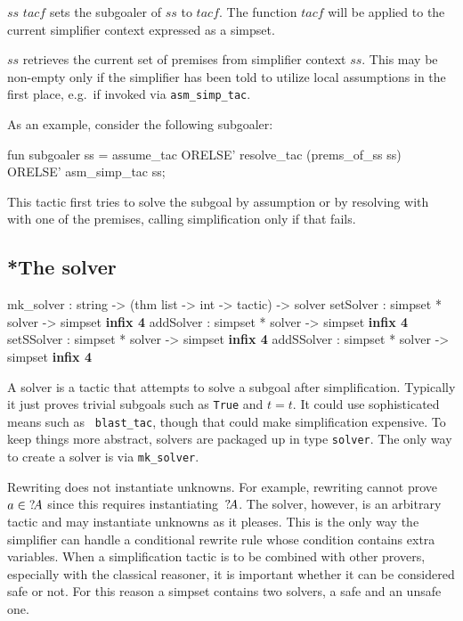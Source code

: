 \begin{ttdescription}
  
\item[$ss$ \ttindexbold{setsubgoaler} $tacf$] sets the subgoaler of
  $ss$ to $tacf$.  The function $tacf$ will be applied to the current
  simplifier context expressed as a simpset.
  
\item[\ttindexbold{prems_of_ss} $ss$] retrieves the current set of
  premises from simplifier context $ss$.  This may be non-empty only
  if the simplifier has been told to utilize local assumptions in the
  first place, e.g.\ if invoked via \texttt{asm_simp_tac}.

\end{ttdescription}

As an example, consider the following subgoaler:
\begin{ttbox}
fun subgoaler ss =
    assume_tac ORELSE'
    resolve_tac (prems_of_ss ss) ORELSE'
    asm_simp_tac ss;
\end{ttbox}
This tactic first tries to solve the subgoal by assumption or by
resolving with with one of the premises, calling simplification only
if that fails.


\subsection{*The solver}\label{sec:simp-solver}
\begin{ttbox}
mk_solver  : string -> (thm list -> int -> tactic) -> solver
setSolver  : simpset * solver -> simpset \hfill{\bf infix 4}
addSolver  : simpset * solver -> simpset \hfill{\bf infix 4}
setSSolver : simpset * solver -> simpset \hfill{\bf infix 4}
addSSolver : simpset * solver -> simpset \hfill{\bf infix 4}
\end{ttbox}

A solver is a tactic that attempts to solve a subgoal after
simplification.  Typically it just proves trivial subgoals such as
\texttt{True} and $t=t$.  It could use sophisticated means such as {\tt
  blast_tac}, though that could make simplification expensive.
To keep things more abstract, solvers are packaged up in type
\texttt{solver}. The only way to create a solver is via \texttt{mk_solver}.

Rewriting does not instantiate unknowns.  For example, rewriting
cannot prove $a\in {?\!A}$ since this requires
instantiating~${?\!A}$.  The solver, however, is an arbitrary tactic
and may instantiate unknowns as it pleases.  This is the only way the
simplifier can handle a conditional rewrite rule whose condition
contains extra variables.  When a simplification tactic is to be
combined with other provers, especially with the classical reasoner,
it is important whether it can be considered safe or not.  For this
reason a simpset contains two solvers, a safe and an unsafe one.

